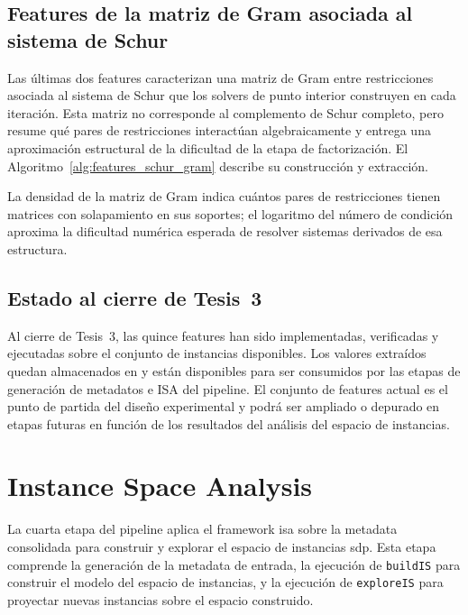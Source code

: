 \newpage
\subsection{Features de la matriz de Gram asociada al sistema de Schur}
\label{subsec:avance_features_schur}

Las últimas dos features caracterizan una matriz de Gram entre restricciones asociada
al sistema de Schur que los solvers de punto interior construyen en cada iteración.
Esta matriz no corresponde al complemento de Schur completo, pero resume qué pares de
restricciones interactúan algebraicamente y entrega una aproximación estructural de la
dificultad de la etapa de factorización.
El Algoritmo~\ref{alg:features_schur_gram} describe su construcción y extracción.



La densidad de la matriz de Gram indica cuántos pares de restricciones tienen
matrices con solapamiento en sus soportes; el logaritmo del número de condición
aproxima la dificultad numérica esperada de resolver sistemas derivados de esa
estructura.

\subsection{Estado al cierre de Tesis~3}
\label{subsec:avance_features_estado}

Al cierre de Tesis~3, las quince features han sido implementadas, verificadas y
ejecutadas sobre el conjunto de instancias disponibles.
Los valores extraídos quedan almacenados en 
y están disponibles para ser consumidos por las etapas de generación de metadatos
e ISA del pipeline.
El conjunto de features actual es el punto de partida del diseño experimental y
podrá ser ampliado o depurado en etapas futuras en función de los resultados del
análisis del espacio de instancias.

\newpage
\section{Instance Space Analysis}
\label{sec:avance_isa}

La cuarta etapa del pipeline aplica el framework \acrshort{isa} sobre la metadata
consolidada para construir y explorar el espacio de instancias \acrshort{sdp}.
Esta etapa comprende la generación de la metadata de entrada, la ejecución de
\texttt{buildIS} para construir el modelo del espacio de instancias, y la ejecución
de \texttt{exploreIS} para proyectar nuevas instancias sobre el espacio construido.

